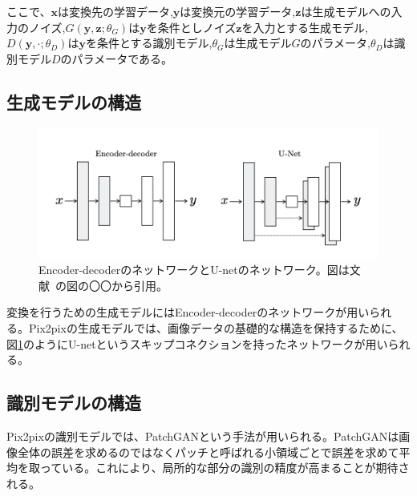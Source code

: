 ここで、$\boldsymbol{x}$は変換先の学習データ,$\boldsymbol{y}$は変換元の学習データ,$\boldsymbol{z}$は生成モデルへの入力のノイズ,$G(\boldsymbol{y},\boldsymbol{z};\theta_G)$は$\boldsymbol{y}$を条件としノイズ$\boldsymbol{z}$を入力とする生成モデル,$D(\boldsymbol{y},\cdot;\theta_D)$は$\boldsymbol{y}$を条件とする識別モデル,$\theta_G$は生成モデル$G$のパラメータ,$\theta_D$は識別モデル$D$のパラメータである。

\subsection{生成モデルの構造}

\begin{figure}[t]
\begin{center}
\includegraphics[width=\hsize]{figure/u-net.png}
\caption{Encoder-decoderのネットワークとU-netのネットワーク。図は文献~\cite{u-net}の図の〇〇から引用。}
\label{fig:u-net}
\end{center}
\end{figure}


変換を行うための生成モデルにはEncoder-decoderのネットワークが用いられる。Pix2pixの生成モデルでは、画像データの基礎的な構造を保持するために、図\ref{fig:u-net}のようにU-net\cite{u-net}というスキップコネクションを持ったネットワークが用いられる。

\subsection{識別モデルの構造}


Pix2pixの識別モデルでは、PatchGANという手法が用いられる。PatchGANは画像全体の誤差を求めるのではなくパッチと呼ばれる小領域ごとで誤差を求めて平均を取っている。これにより、局所的な部分の識別の精度が高まることが期待される。

